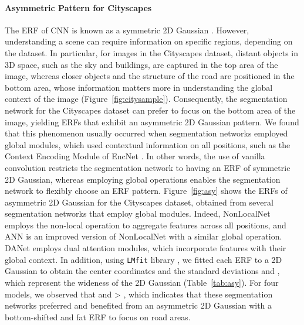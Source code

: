 \documentclass{article}
\def\figref#1{Figure~\ref{#1}}
\def\tabref#1{Table~\ref{#1}}
\begin{document}
\paragraph{Asymmetric Pattern for Cityscapes} The ERF of CNN is known as a symmetric 2D Gaussian \citep{DBLP:conf/nips/LuoLUZ16,DBLP:journals/prl/KimCJLJK23}. However, understanding a scene can require information on specific regions, depending on the dataset. In particular, for images in the Cityscapes dataset, distant objects in 3D space, such as the sky and buildings, are captured in the top area of the image, whereas closer objects and the structure of the road are positioned in the bottom area, whose information matters more in understanding the global context of the image (\figref{fig:citysample}). Consequently, the segmentation network for the Cityscapes dataset can prefer to focus on the bottom area of the image, yielding ERFs that exhibit an asymmetric 2D Gaussian pattern. We found that this phenomenon usually occurred when segmentation networks employed global modules, which used contextual information on all positions, such as the Context Encoding Module of EncNet \citep{DBLP:conf/cvpr/0005DSZWTA18}. In other words, the use of vanilla convolution restricts the segmentation network to having an ERF of symmetric 2D Gaussian, whereas employing global operations enables the segmentation network to flexibly choose an ERF pattern. \figref{fig:asy} shows the ERFs of asymmetric 2D Gaussian for the Cityscapes dataset, obtained from several segmentation networks that employ global modules. Indeed, NonLocalNet \citep{DBLP:conf/cvpr/0004GGH18} employs the non-local operation to aggregate features across all positions, and ANN \citep{DBLP:conf/iccv/ZhuXBHB19} is an improved version of NonLocalNet with a similar global operation. DANet \citep{DBLP:conf/cvpr/FuLT0BFL19} employs dual attention modules, which incorporate features with their global context. In addition, using \texttt{LMfit} library \citep{newville2016lmfit}, we fitted each ERF to a 2D Gaussian to obtain the center coordinates  and the standard deviations  and , which represent the wideness of the 2D Gaussian (\tabref{tab:asy}). For four models, we observed that  and  > , which indicates that these segmentation networks preferred and benefited from an asymmetric 2D Gaussian with a bottom-shifted and fat ERF to focus on road areas.
\end{document}
